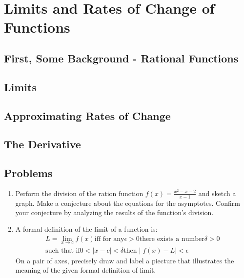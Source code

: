\documentclass[../precalc.tex]{subfiles}
\begin{document}
\chapter{Limits and Rates of Change of Functions}
\section{First, Some Background - Rational Functions}
\section{Limits}
\section{Approximating Rates of Change}
\section{The Derivative}

\section*{Problems}
\begin{enumerate}
    \item Perform the division of the ration function $f(x)=\frac{x^2-x-2}{x-1}$ and sketch a graph. Make a conjecture about the equations for the asymptotes. Confirm your conjecture by analyzing the results of the function's division.
    \item A formal definition of the limit of a function is:
    \begin{align*}
    L = \lim_{x\to c}f(x) \text{iff for any} \epsilon > 0 \text{there exists a number} \delta > 0\\
    \text{such that if} 0<\mid x-c \mid < \delta \text{then} \mid f(x) - L \mid < \epsilon
    \end{align*}
    On a pair of axes, precisely draw and label a piecture that illustrates the meaning of the given formal definition of limit.
\end{enumerate}
\end{document}
